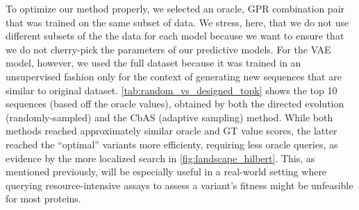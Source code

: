 \documentclass{article}
\begin{document}
To optimize our method properly, we selected an oracle, GPR combination pair
that was trained on the same subset of data. We stress, here, that we do not use
different subsets of the the data for each model because we want to ensure that
we do not cherry-pick the parameters of our predictive models. For the VAE
model, however, we used the full dataset because it was trained in an
unsupervised fashion only for the context of generating new sequences that are
similar to original dataset. \cref{tab:random_vs_designed_topk} shows the top 10
sequences (based off the oracle values), obtained by both the directed evolution
(randomly-sampled) and the CbAS (adaptive sampling) method. While both methods
reached approximately similar oracle and GT value scores, the latter reached the
``optimal'' variants more efficienty, requiring less oracle queries, as evidence
by the more localized search in \cref{fig:landscape_hilbert}. This, as mentioned
previously, will be especially useful in a real-world setting where querying
resource-intensive assays to assess a variant's fitness might be unfeasible for
most proteins. 

\begin{table}[htbp]
  \centering
  \caption{Comparision between the top $k=10$ sequences outputted by the CbAS
  and random optimization strategy, respectively. The values are sorted based on
  their oracle predictions since ground truth would be unknown.}
  \label{tab:random_vs_designed_topk}
\end{table}
\end{document}
